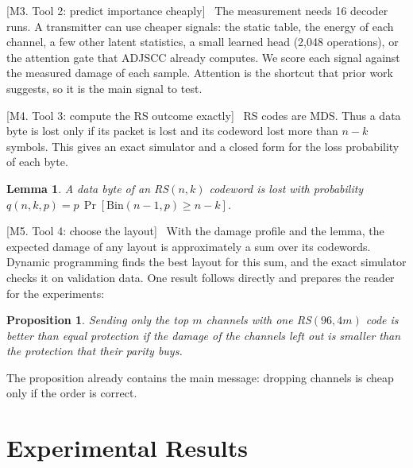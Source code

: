 \documentclass[journal]{IEEEtran}
\newtheorem{lemma}{Lemma}
\newtheorem{proposition}{Proposition}
\newcommand{\beat}[1]{\noindent\textcolor{blue!60!black}{\textsf{\footnotesize [#1]}}\ }
\begin{document}
\beat{M3. Tool 2: predict importance cheaply}
The measurement needs 16 decoder runs. A transmitter can use cheaper signals: the static table, the
energy of each channel, a few other latent statistics, a small learned head (2,048 operations), or the
attention gate that ADJSCC already computes. We score each signal against the measured damage of each
sample. Attention is the shortcut that prior work suggests, so it is the main signal to test.

\beat{M4. Tool 3: compute the RS outcome exactly}
RS codes are MDS. Thus a data byte is lost only if its packet is lost and its codeword lost more than
$n-k$ symbols. This gives an exact simulator and a closed form for the loss probability of each byte.
\begin{lemma}
A data byte of an RS$(n,k)$ codeword is lost with probability $q(n,k,p)=p\,\Pr[\mathrm{Bin}(n-1,p)\ge n-k]$.
\end{lemma}

\beat{M5. Tool 4: choose the layout}
With the damage profile and the lemma, the expected damage of any layout is approximately a sum over its
codewords. Dynamic programming finds the best layout for this sum, and the exact simulator checks it on
validation data. One result follows directly and prepares the reader for the experiments:
\begin{proposition}
Sending only the top $m$ channels with one RS$(96,4m)$ code is better than equal protection if the damage
of the channels left out is smaller than the protection that their parity buys.
\end{proposition}
The proposition already contains the main message: dropping channels is cheap only if the order is
correct.

\section{Experimental Results}\label{sec:exp}
\end{document}
